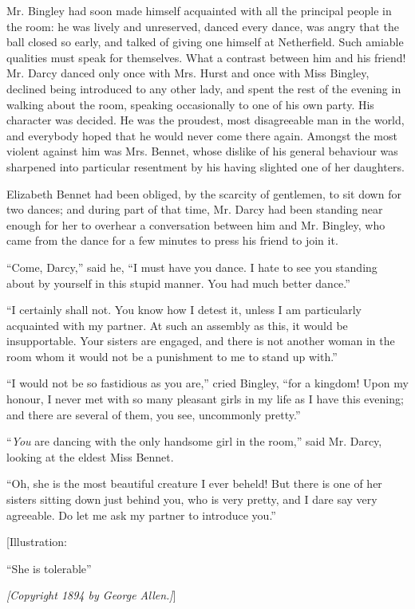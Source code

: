\documentclass[12pt]{book}
\begin{document}
Mr. Bingley had soon made himself acquainted with all the principal people in the room: he was lively and unreserved, danced every dance, was angry that the ball closed so early, and talked of giving one himself at Netherfield. Such amiable qualities must speak for themselves. What a contrast between him and his friend! Mr. Darcy danced only once with Mrs. Hurst and once with Miss Bingley, declined being introduced to any other lady, and spent the rest of the evening in walking about the room, speaking occasionally to one of his own party. His character was decided. He was the proudest, most disagreeable man in the world, and everybody hoped that he would never come there again. Amongst the most violent against him was Mrs. Bennet, whose dislike of his general behaviour was sharpened into particular resentment by his having slighted one of her daughters.

Elizabeth Bennet had been obliged, by the scarcity of gentlemen, to sit down for two dances; and during part of that time, Mr. Darcy had been standing near enough for her to overhear a conversation between him and Mr. Bingley, who came from the dance for a few minutes to press his friend to join it.

``Come, Darcy,'' said he, ``I must have you dance. I hate to see you standing about by yourself in this stupid manner. You had much better dance.''

``I certainly shall not. You know how I detest it, unless I am particularly acquainted with my partner. At such an assembly as this, it would be insupportable. Your sisters are engaged, and there is not another woman in the room whom it would not be a punishment to me to stand up with.''

``I would not be so fastidious as you are,'' cried Bingley, ``for a kingdom! Upon my honour, I never met with so many pleasant girls in my life as I have this evening; and there are several of them, you see, uncommonly pretty.''

``\textit{You} are dancing with the only handsome girl in the room,'' said Mr. Darcy, looking at the eldest Miss Bennet.

``Oh, she is the most beautiful creature I ever beheld! But there is one of her sisters sitting down just behind you, who is very pretty, and I dare say very agreeable. Do let me ask my partner to introduce you.''

[Illustration:

``She is tolerable''

\emph{[\textit{Copyright 1894 by George Allen.}]}]
\end{document}
